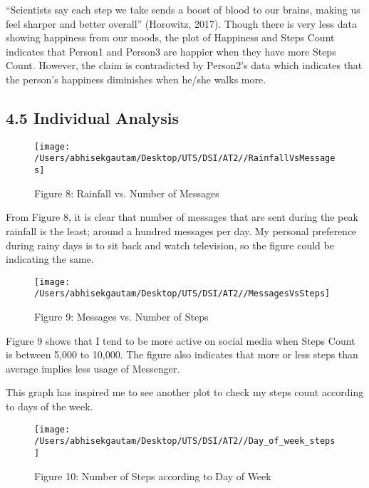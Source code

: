 \documentclass[
]{article}
\begin{document}
``Scientists say each step we take sends a boost of blood to our brains,
making us feel sharper and better overall'' (Horowitz, 2017). Though
there is very less data showing happiness from our moods, the plot of
Happiness and Steps Count indicates that Person1 and Person3 are happier
when they have more Steps Count. However, the claim is contradicted by
Person2's data which indicates that the person's happiness diminishes
when he/she walks more.

\hypertarget{individual-analysis}{%
\subsection{4.5 Individual Analysis}\label{individual-analysis}}

\begin{figure}

{\centering \texttt{[image: /Users/abhisekgautam/Desktop/UTS/DSI/AT2//RainfallVsMessages]} 

}

\caption{\label{fig:figs}Figure 8: Rainfall vs. Number of Messages}\label{fig:add_picture6}
\end{figure}

From Figure 8, it is clear that number of messages that are sent during
the peak rainfall is the least; around a hundred messages per day. My
personal preference during rainy days is to sit back and watch
television, so the figure could be indicating the same.

\begin{figure}

{\centering \texttt{[image: /Users/abhisekgautam/Desktop/UTS/DSI/AT2//MessagesVsSteps]} 

}

\caption{\label{fig:figs}Figure 9: Messages vs. Number of Steps}\label{fig:add_picture7}
\end{figure}

Figure 9 shows that I tend to be more active on social media when Steps
Count is between 5,000 to 10,000. The figure also indicates that more or
less steps than average implies less usage of Messenger.

This graph has inspired me to see another plot to check my steps count
according to days of the week.

\begin{figure}

{\centering \texttt{[image: /Users/abhisekgautam/Desktop/UTS/DSI/AT2//Day\_of\_week\_steps]} 

}

\caption{\label{fig:figs}Figure 10: Number of Steps according to Day of Week}\label{fig:add_picture8}
\end{figure}
\end{document}
